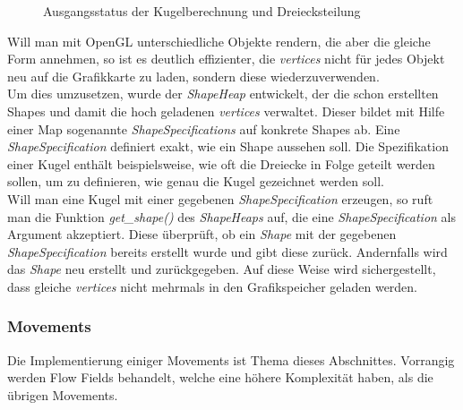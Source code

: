 \documentclass[11pt,a4paper]{article}
\begin{document}
\begin{center}
\begin{figure}[!ht]
\centering
\vspace{20pt}
\caption[Ausgangsstatus der Kugelberechnung und Dreiecksteilung]{Ausgangsstatus der Kugelberechnung und Dreiecksteilung}
\label{fig:kugelVertices}
\end{figure}
\end{center}
\noindent
Will man mit OpenGL unterschiedliche Objekte rendern, die aber die gleiche Form annehmen, so ist es deutlich effizienter, die \textit{vertices} nicht für jedes Objekt neu auf die Grafikkarte zu laden, sondern diese wiederzuverwenden.\\
Um dies umzusetzen, wurde der \textit{ShapeHeap} entwickelt, der die schon erstellten Shapes und damit die hoch geladenen \textit{vertices} verwaltet. Dieser bildet mit Hilfe einer Map sogenannte \textit{ShapeSpecifications} auf konkrete Shapes ab. Eine \textit{ShapeSpecification} definiert exakt, wie ein Shape aussehen soll. Die Spezifikation einer Kugel enthält beispielsweise, wie oft die Dreiecke in Folge geteilt werden sollen, um zu definieren, wie genau die Kugel gezeichnet werden soll.\\
Will man eine Kugel mit einer gegebenen \textit{ShapeSpecification} erzeugen, so ruft man die Funktion \mbox{\textit{get\_shape()}} des \mbox{\textit{ShapeHeaps}} auf, die eine \textit{ShapeSpecification} als Argument akzeptiert. Diese überprüft, ob ein \textit{Shape} mit der gegebenen \textit{ShapeSpecification} bereits erstellt wurde und gibt diese zurück. Andernfalls wird das \textit{Shape} neu erstellt und zurückgegeben. Auf diese Weise wird sichergestellt, dass gleiche \textit{vertices} nicht mehrmals in den Grafikspeicher geladen werden.

\subsubsection{Movements}
Die Implementierung einiger Movements ist Thema dieses Abschnittes. Vorrangig werden Flow Fields behandelt, welche eine höhere Komplexität haben, als die übrigen Movements.
\end{document}
